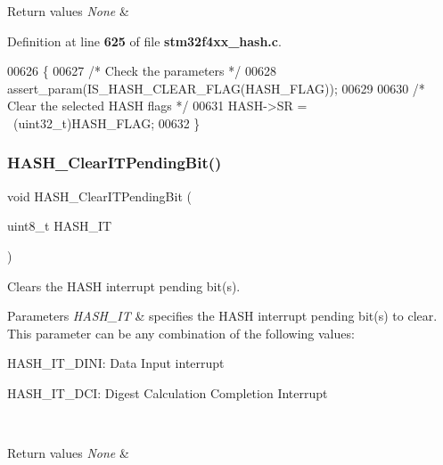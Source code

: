 \begin{DoxyRetVals}{Return values}
{\em None} & \\
\hline
\end{DoxyRetVals}


Definition at line \textbf{ 625} of file \textbf{ stm32f4xx\+\_\+hash.\+c}.


\begin{DoxyCode}
00626 \{
00627   \textcolor{comment}{/* Check the parameters */}
00628   assert_param(IS_HASH_CLEAR_FLAG(HASH\_FLAG));
00629   
00630   \textcolor{comment}{/* Clear the selected HASH flags */}
00631   HASH->SR = ~(uint32\_t)HASH\_FLAG;
00632 \}
\end{DoxyCode}
\mbox{\label{group__HASH__Group5_ga97b9508f09c6fb572f65832f124da26d}} 
\subsubsection{H\+A\+S\+H\+\_\+\+Clear\+I\+T\+Pending\+Bit()}
{\footnotesize\ttfamily void H\+A\+S\+H\+\_\+\+Clear\+I\+T\+Pending\+Bit (\begin{DoxyParamCaption}\item[{uint8\+\_\+t}]{H\+A\+S\+H\+\_\+\+IT }\end{DoxyParamCaption})}



Clears the H\+A\+SH interrupt pending bit(s). 


\begin{DoxyParams}{Parameters}
{\em H\+A\+S\+H\+\_\+\+IT} & specifies the H\+A\+SH interrupt pending bit(s) to clear. This parameter can be any combination of the following values\+: \begin{DoxyItemize}
\item H\+A\+S\+H\+\_\+\+I\+T\+\_\+\+D\+I\+NI\+: Data Input interrupt \item H\+A\+S\+H\+\_\+\+I\+T\+\_\+\+D\+CI\+: Digest Calculation Completion Interrupt \end{DoxyItemize}
\\
\hline
\end{DoxyParams}

\begin{DoxyRetVals}{Return values}
{\em None} & \\
\hline
\end{DoxyRetVals}


